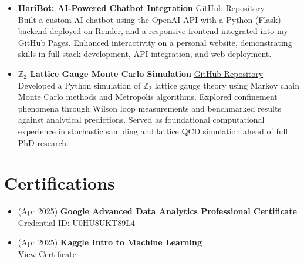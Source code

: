 \documentclass[11pt]{article}
\begin{document}
\begin{itemize}
    \item \textbf{HariBot: AI-Powered Chatbot Integration} \hfill \href{https://github.com/Hariprashad-Ravikumar/Hari-ChatBot}{GitHub Repository} \\
    Built a custom AI chatbot using the OpenAI API with a Python (Flask) backend deployed on Render, and a responsive frontend integrated into my GitHub Pages. Enhanced interactivity on a personal website, demonstrating skills in full-stack development, API integration, and web deployment.
    \item \textbf{$\mathbb{Z}_2$ Lattice Gauge Monte Carlo Simulation} \hfill \href{https://github.com/Hariprashad-Ravikumar/Z2_LatticeGauge_Monte_Carlo_Simulation}{GitHub Repository} \\
    Developed a Python simulation of $\mathbb{Z}_2$ lattice gauge theory using Markov chain Monte Carlo methods and Metropolis algorithms. Explored confinement phenomena through Wilson loop measurements and benchmarked results against analytical predictions. Served as foundational computational experience in stochastic sampling and lattice QCD simulation ahead of full PhD research.
\end{itemize}

\section*{Certifications}
\vspace{-0.3em}
\begin{itemize}
    \item (Apr 2025) \textbf{Google Advanced Data Analytics Professional Certificate} \\
    Credential ID: \href{https://www.coursera.org/account/accomplishments/professional-cert/certificate/U0HU8UKT89L4}{U0HU8UKT89L4} 
    \item (Apr 2025) \textbf{Kaggle Intro to Machine Learning} \\
    \href{https://www.kaggle.com/learn/certification/hariprashadravikumar/intro-to-machine-learning}{View Certificate} 
\end{itemize}
\end{document}
